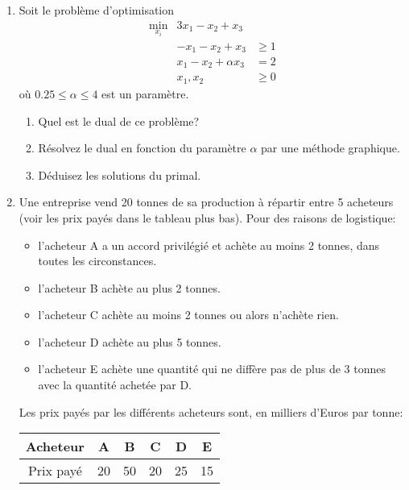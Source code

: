 \begin{enumerate}
    \begin{solution}
    \end{solution}

  \item Soit le problème d'optimisation
    \begin{eqnarray*}
      \min_{x_i} & 3 x_1- x_2+ x_3 &  \\
      &-x_1 -x_2+ x_3  &\ge 1 \\
      &x_1- x_2 +\alpha x_3  &= 2 \\
      &x_1, x_2 &\ge 0
    \end{eqnarray*}
    où  $0.25\le\alpha\le4$ est un paramètre.
    \begin{enumerate}
      \item Quel est le dual de ce problème?
      \item Résolvez le dual en fonction
        du paramètre $\alpha$ par une méthode graphique.
      \item Déduisez les solutions du primal.
    \end{enumerate}









    \begin{solution}
    \end{solution}

  \item Une entreprise vend 20 tonnes de sa production à répartir
    entre 5 acheteurs (voir les prix payés dans le tableau plus bas).
    Pour des raisons de logistique:
    \begin{itemize}
      \item l'acheteur A a un accord privilégié et achète au moins 2
      tonnes, dans toutes les circonstances. \item l'acheteur B achète
      au plus 2 tonnes. \item l'acheteur C achète au moins 2 tonnes ou
      alors n'achète rien. \item l'acheteur D achète au plus 5 tonnes.
      \item l'acheteur E achète une quantité qui ne diffère pas de plus
        de 3 tonnes avec la quantité achetée par D.
    \end{itemize}

    Les prix payés par les différents acheteurs sont, en milliers
    d'Euros par tonne:
    \begin{center}
      \begin{tabular}{|c|c|c|c|c|c|}
        \hline %
        Acheteur & A & B & C & D & E\\
        \hline
        Prix payé & 20 & 50 & 20 & 25 & 15 \\
        \hline
      \end{tabular}
    \end{center}


\end{enumerate}
